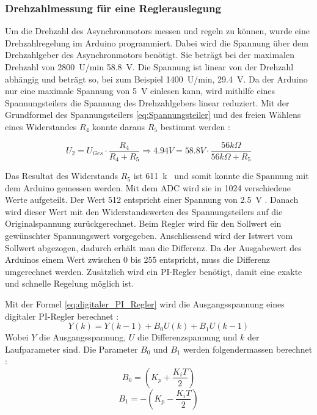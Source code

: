 \subsubsection{Drehzahlmessung für eine Reglerauslegung}
Um die Drehzahl des Asynchronmotors messen und regeln zu können, wurde eine Drehzahlregelung im Arduino programmiert. Dabei wird die Spannung über dem Drehzahlgeber des Asynchronmotors benötigt. Sie beträgt bei der maximalen Drehzahl von \SI{2800}{U/min} \SI{58.8}{V}. Die Spannung ist linear von der Drehzahl abhängig und beträgt so, bei zum Beispiel \SI{1400}{U/min}, \SI{29.4}{V}. Da der Arduino nur eine maximale Spannung von \SI{5}{V} einlesen kann, wird mithilfe eines Spannungsteilers die Spannung des Drehzahlgebers linear reduziert. Mit der Grundformel des Spannungsteilers \ref{eq:Spannungsteiler} und des freien Wählens eines Widerstandes $R_4$ konnte daraus $R_5$ bestimmt werden \cite{Spannungsteiler}:

\begin{equation}\label{eq:Spannungsteiler}
U_2=U_{Ges} \cdot\frac{R_4}{R_4 + R_5} \Longrightarrow 4.94 V = 58.8 V \cdot \frac{56k\Omega}{56k\Omega + R_5}
\end{equation}

Das Resultat des Widerstands $R_5$ ist \SI{611}{k\Omega} und somit konnte die Spannung mit dem Arduino gemessen werden. Mit dem ADC wird sie in 1024 verschiedene Werte aufgeteilt. Der Wert 512 entspricht  einer Spannung von \SI{2.5}{V} \cite{Spannungsmessung}. Danach wird dieser Wert mit den Widerstandswerten des Spannungsteilers auf die Originalspannung zurückgerechnet. Beim Regler wird für den Sollwert ein gewünschter Spannungswert vorgegeben. Anschliessend wird der Istwert vom Sollwert abgezogen, dadurch erhält man die Differenz. Da der Ausgabewert des Arduinos einem Wert zwischen 0 bis 255 entspricht, muss die Differenz umgerechnet werden. Zusätzlich wird ein PI-Regler benötigt, damit eine exakte und schnelle Regelung möglich ist.

\newpage
Mit der Formel \ref{eq:digitaler_PI_Regler} wird die Ausgangsspannung eines digitaler PI-Regler berechnet \cite{Quelle_Marco} : 
\begin{equation}\label{eq:digitaler_PI_Regler}
Y(k) = Y(k-1)+ B_0U(k)+B_1U(k-1)
\end{equation}
Wobei $Y$ die Ausgangsspannung, $U$ die Differenzspannung und $k$ der Laufparameter sind. Die Parameter $B_0$ und $B_1$ werden folgendermassen berechnet \cite{PI_Regler}:
\begin{equation}\label{eq:B0}
B_0 = \left(K_p + \frac{K_iT}{2}\right) 
\end{equation}
\begin{equation}\label{eq:B1}
B_1 = -\left(K_p - \frac{K_iT}{2}\right) 
\end{equation}

